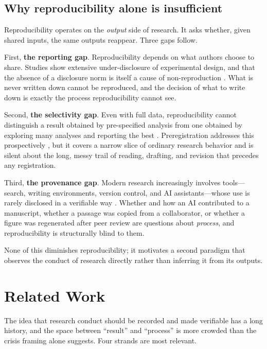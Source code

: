 \documentclass[11pt]{article}
\begin{document}
\subsection{Why reproducibility alone is insufficient}

Reproducibility operates on the \emph{output} side of research. It asks whether, given
shared inputs, the same outputs reappear. Three gaps follow.

First, \textbf{the reporting gap}. Reproducibility depends on what authors choose to
share. Studies show extensive under-disclosure of experimental design, and that the
absence of a disclosure norm is itself a cause of non-reproduction
\parencite{nosek2015top}. What is never written down cannot be reproduced, and the
decision of what to write down is exactly the process reproducibility cannot see.

Second, \textbf{the selectivity gap}. Even with full data, reproducibility cannot
distinguish a result obtained by pre-specified analysis from one obtained by
exploring many analyses and reporting the best \parencite{ioannidis2005,gelman2014}.
Preregistration addresses this prospectively \parencite{nosek2018}, but it covers a
narrow slice of ordinary research behavior and is silent about the long, messy
trail of reading, drafting, and revision that precedes any registration.

Third, \textbf{the provenance gap}. Modern research increasingly involves tools---search,
writing environments, version control, and AI assistants---whose use is rarely
disclosed in a verifiable way \parencite{gao2023}. Whether and how an AI
contributed to a manuscript, whether a passage was copied from a collaborator, or
whether a figure was regenerated after peer review are questions about \emph{process},
and reproducibility is structurally blind to them.

None of this diminishes reproducibility; it motivates a second paradigm that observes
the conduct of research directly rather than inferring it from its outputs.

\section{Related Work}
\label{sec:related}

The idea that research conduct should be recorded and made verifiable has a long
history, and the space between ``result'' and ``process'' is more crowded than the
crisis framing alone suggests. Four strands are most relevant.
\end{document}

